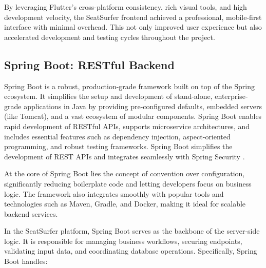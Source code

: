 \documentclass[12pt,a4paper]{report} %
\begin{document}
By leveraging Flutter's cross-platform consistency, rich visual tools, and high development velocity, the SeatSurfer frontend achieved a professional, mobile-first interface with minimal overhead. This not only improved user experience but also accelerated development and testing cycles throughout the project.

\subsection{Spring Boot: RESTful Backend}

Spring Boot is a robust, production-grade framework built on top of the Spring ecosystem. It simplifies the setup and development of stand-alone, enterprise-grade applications in Java by providing pre-configured defaults, embedded servers (like Tomcat), and a vast ecosystem of modular components. Spring Boot enables rapid development of RESTful APIs, supports microservice architectures, and includes essential features such as dependency injection, aspect-oriented programming, and robust testing frameworks. Spring Boot simplifies the development of REST APIs and integrates seamlessly with Spring Security \cite{baeldung2023springapi}.

At the core of Spring Boot lies the concept of convention over configuration, significantly reducing boilerplate code and letting developers focus on business logic. The framework also integrates smoothly with popular tools and technologies such as Maven, Gradle, and Docker, making it ideal for scalable backend services.

In the SeatSurfer platform, Spring Boot serves as the backbone of the server-side logic. It is responsible for managing business workflows, securing endpoints, validating input data, and coordinating database operations. Specifically, Spring Boot handles:
\end{document}
